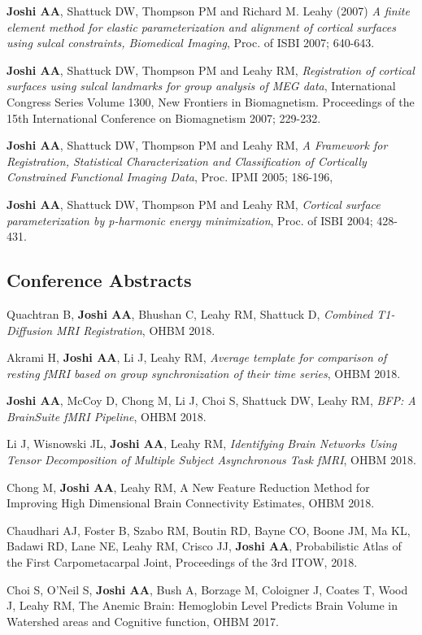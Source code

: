 \documentclass[overlapped,line,letterpaper]{res}
\begin{document}
\begin{resume}
\textbf{Joshi AA}, Shattuck DW, Thompson PM and Richard M. Leahy (2007) \textit{A finite element method for elastic parameterization and alignment of cortical surfaces using sulcal constraints, Biomedical Imaging}, Proc. of ISBI 2007; 640-643. 

\textbf{Joshi AA}, Shattuck DW, Thompson PM and Leahy RM, \textit{Registration of cortical surfaces using sulcal landmarks for group analysis of MEG data}, International Congress Series Volume 1300, New Frontiers in Biomagnetism. Proceedings of the 15th International Conference on Biomagnetism 2007; 229-232.

\textbf{Joshi AA}, Shattuck DW, Thompson PM and Leahy RM, \textit{A Framework for Registration, Statistical Characterization and Classification of Cortically Constrained Functional Imaging Data}, Proc. IPMI 2005;  186-196,

\textbf{Joshi AA}, Shattuck DW, Thompson PM and Leahy RM, \textit{Cortical surface parameterization by p-harmonic energy minimization}, Proc. of ISBI 2004; 428-431.

\subsection{Conference Abstracts}

Quachtran B, \textbf{Joshi AA}, Bhushan C, Leahy RM, Shattuck D, \textit{Combined T1-Diffusion MRI Registration}, OHBM 2018.

Akrami H, \textbf{Joshi AA}, Li J, Leahy RM, \textit{Average template for comparison of resting fMRI based on group synchronization of their time series}, OHBM 2018.

\textbf{Joshi AA}, McCoy D, Chong M, Li J, Choi S, Shattuck DW, Leahy RM, \textit{BFP: A BrainSuite fMRI Pipeline}, OHBM 2018.

Li J, Wisnowski JL, \textbf{Joshi AA}, Leahy RM, \textit{Identifying Brain Networks Using Tensor Decomposition of Multiple Subject Asynchronous Task fMRI}, OHBM 2018.

Chong M, \textbf{Joshi AA}, Leahy RM, A New Feature Reduction Method for Improving High Dimensional Brain Connectivity Estimates, OHBM 2018.

Chaudhari AJ, Foster B, Szabo RM, Boutin RD, Bayne CO, Boone JM, Ma KL, Badawi RD, Lane NE, Leahy RM, Crisco JJ, \textbf{Joshi AA}, Probabilistic Atlas of the First Carpometacarpal Joint, Proceedings of the 3rd ITOW, 2018.

Choi S, O'Neil S, \textbf{Joshi AA}, Bush A, Borzage M, Coloigner J, Coates T, Wood J, Leahy RM, The Anemic Brain: Hemoglobin Level Predicts Brain Volume in Watershed areas and Cognitive function, OHBM 2017.


\end{resume}
\end{document}
